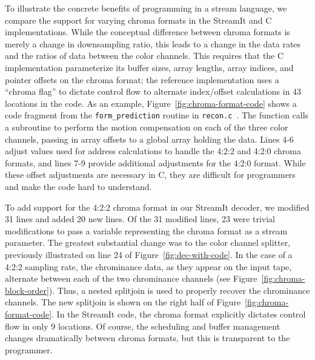 \label{section:chroma}

To illustrate the concrete benefits of programming in a stream
language, we compare the support for varying chroma formats in the
StreamIt and C implementations.  While the conceptual difference
between chroma formats is merely a change in downsampling ratio, this
leads to a change in the data rates and the ratios of data between the
color channels. This requires that the C implementation parameterize
its buffer sizes, array lengths, array indices, and pointer offsets on
the chroma format; the reference implementation uses a ``chroma flag''
to dictate control flow to alternate index/offset calculations in 43
locations in the code. As an example,
Figure~\ref{fig:chroma-format-code} shows a code fragment from the
\texttt{form\_prediction} routine in
\texttt{recon.c}~\cite{reference-mpeg-c}. The function calls a
subroutine to perform the motion compensation on each of the three
color channels, passing in array offsets to a global array holding the
data. Lines 4-6 adjust values used for address calculations to handle
the 4:2:2 and 4:2:0 chroma formats, and lines 7-9 provide additional
adjustments for the 4:2:0 format. While these offset adjustments are
necessary in C, they are difficult for programmers and make the code
hard to understand.

To add support for the 4:2:2 chroma format in our StreamIt decoder, we
modified 31 lines and added 20 new lines. Of the 31 modified lines, 23
were trivial modifications to pass a variable representing the chroma
format as a stream parameter. The greatest substantial change was to
the color channel splitter, previously illustrated on line 24 of
Figure~\ref{fig:dec-with-code}. In the case of a 4:2:2 sampling rate,
the chrominance data, as they appear on the input tape, alternate
between each of the two chrominance channels (see
Figure~\ref{fig:chroma-block-order}). Thus, a nested splitjoin is used
to properly recover the chrominance channels. The new splitjoin is
shown on the right half of Figure~\ref{fig:chroma-format-code}.  In
the StreamIt code, the chroma format explicitly dictates control flow
in only 9 locations. Of course, the scheduling and buffer management
changes dramatically between chroma formats, but this is transparent
to the programmer.

